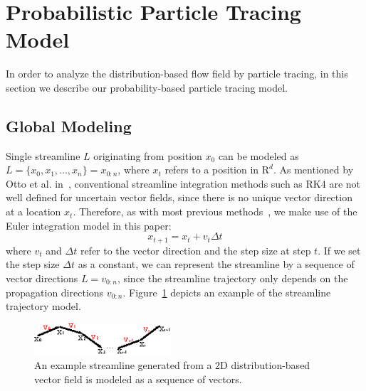\section{Probabilistic Particle Tracing Model}

In order to analyze the distribution-based flow field by particle tracing, in this section we describe our probability-based particle tracing model.

\subsection{Global Modeling}

Single streamline $L$ originating from position ${x_0}$ can be modeled as $L = \{ {x_0},{x_1},...,{x_n}\} = {x_{0:n}}$, where $x_t$ refers to a position in $\mathrm{R}^d$. As mentioned by Otto et al. in~\cite{Otto10a, Otto11a}, conventional streamline integration methods such as RK4 are not well defined for uncertain vector fields, since there is no unique vector direction at a location ${x_t}$. Therefore, as with most previous methods~\cite{Otto10a, Otto11a}, we make use of the Euler integration model in this paper:
\begin{equation}
  {x_{t + 1}} = {x_t} + {v_t}\Delta t
\end{equation}
where ${v_t}$ and $\Delta t$ refer to the vector direction and the step size at step $t$. If we set the step size $\Delta t$ as a constant, we can represent the streamline by a sequence of vector directions ${L = v_{0:n}}$, since the streamline trajectory only depends on the propagation directions $v_{0:n}$. Figure~\ref{trajectory} depicts an example of the streamline trajectory model.

\begin{figure}[htb]
  \centering
  \includegraphics[width=2in]{../figures/trajectory.eps}
  \caption{An example streamline generated from a 2D distribution-based vector field is modeled as a sequence of vectors.}
  \label{trajectory}
\end{figure}

